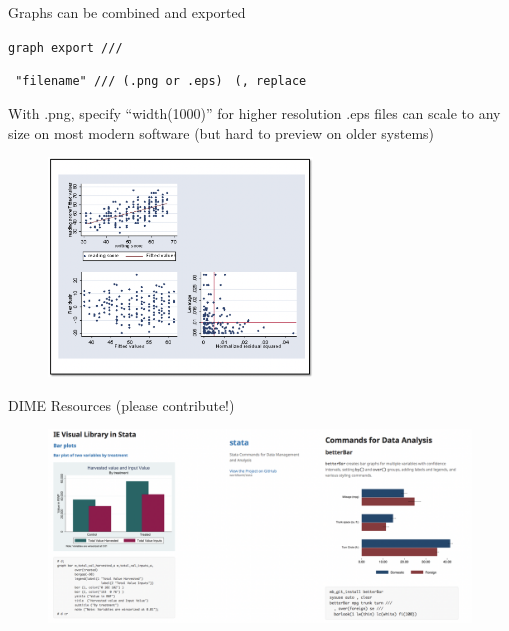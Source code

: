 \documentclass[aspectratio=169]{beamer}
\begin{document}
\begin{frame}{Graphs can be combined and exported}
	\begin{multicols}{2}	
		
		\leavevmode 	\newline \texttt{graph export ///}

		\leavevmode 	\newline  \texttt{  "filename" /// (.png or .eps)}
		\leavevmode		\newline  \texttt{ (, replace}
 
		\leavevmode		\newline  With .png, specify “width(1000)” for higher resolution
		\newline  .eps files can scale to any size on most modern software (but hard to preview on older systems)
		
		\begin{figure}
			\centering
			\includegraphics[width=70mm]{img/Styling2}
		\end{figure}
		
	\end{multicols}
\end{frame}


\begin{frame}{DIME Resources (please contribute!)}
	
	\begin{figure}
		\centering
		\includegraphics[width=\linewidth]{img/Resources}
	\end{figure}
	
\end{frame}
\end{document}
